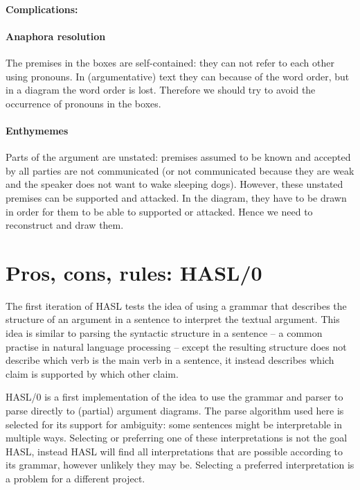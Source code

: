 \documentclass{IOS-Book-Article}
\begin{document}
\paragraph{Complications:}

\paragraph{Anaphora resolution}
The premises in the boxes are self-contained: they can not refer to each other using pronouns. In (argumentative) text they can because of the word order, but in a diagram the word order is lost. Therefore we should try to avoid the occurrence of pronouns in the boxes.

\paragraph{Enthymemes}
Parts of the argument are unstated: premises assumed to be known and accepted by all parties are not communicated (or not communicated because they are weak and the speaker does not want to wake sleeping dogs). However, these unstated premises can be supported and attacked. In the diagram, they have to be drawn in order for them to be able to supported or attacked. Hence we need to reconstruct and draw them.

\section{Pros, cons, rules: HASL/0}

The first iteration of HASL tests the idea of using a grammar that describes the structure of an argument in a sentence to interpret the textual argument. This idea is similar to parsing the syntactic structure in a sentence -- a common practise in natural language processing -- except the resulting structure does not describe which verb is the main verb in a sentence, it instead describes which claim is supported by which other claim.

HASL/0 is a first implementation of the idea to use the grammar and parser to parse directly to (partial) argument diagrams. The parse algorithm used here is selected for its support for ambiguity: some sentences might be interpretable in multiple ways. Selecting or preferring one of these interpretations is not the goal HASL, instead HASL will find all interpretations that are possible according to its grammar, however unlikely they may be. Selecting a preferred interpretation is a problem for a different project.
\end{document}
